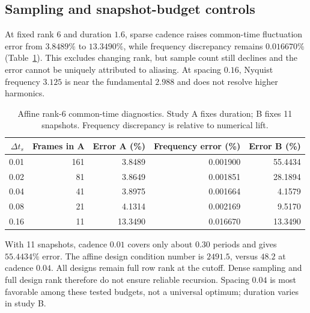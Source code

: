\documentclass[11pt,a4paper]{article}
\begin{document}
\subsection{Sampling and snapshot-budget controls}
At fixed rank 6 and duration $1.6$, sparse cadence raises common-time fluctuation error from $3.8489\%$ to $13.3490\%$, while frequency discrepancy remains $0.016670\%$ (Table~\ref{tab:cadence}). This excludes changing rank, but sample count still declines and the error cannot be uniquely attributed to aliasing. At spacing $0.16$, Nyquist frequency $3.125$ is near the fundamental $2.988$ and does not resolve higher harmonics.
\begin{table}[htbp]
\centering\small
\caption{Affine rank-6 common-time diagnostics. Study A fixes duration; B fixes 11 snapshots. Frequency discrepancy is relative to numerical lift.}\label{tab:cadence}
\begin{tabular}{rrrrr}\toprule
$\Delta t_s$ & Frames in A & Error A (\%) & Frequency error (\%) & Error B (\%)\\\midrule
0.01&161&3.8489&0.001900&55.4434\\
0.02&81&3.8649&0.001851&28.1894\\
0.04&41&3.8975&0.001664&4.1579\\
0.08&21&4.1314&0.002169&9.5170\\
0.16&11&13.3490&0.016670&13.3490\\\bottomrule
\end{tabular}
\end{table}
With 11 snapshots, cadence $0.01$ covers only about $0.30$ periods and gives $55.4434\%$ error. The affine design condition number is $2491.5$, versus $48.2$ at cadence $0.04$. All designs remain full row rank at the cutoff. Dense sampling and full design rank therefore do not ensure reliable recursion. Spacing $0.04$ is most favorable among these tested budgets, not a universal optimum; duration varies in study B.
\end{document}
